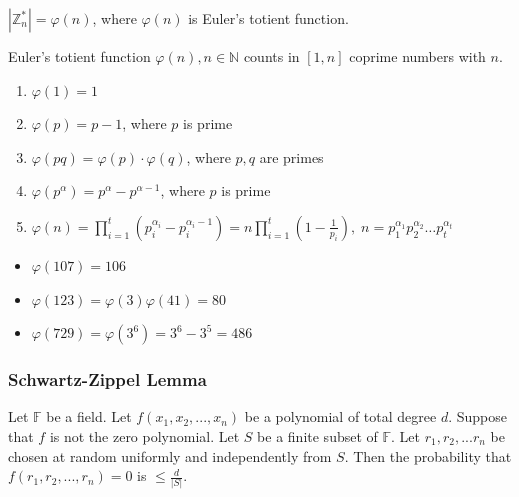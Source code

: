 \documentclass[../lecture-notes.tex]{subfiles}
\begin{document}
\begin{lemma}
    $|\mathbb{Z}_{n}^{*}| = \varphi(n)$, where $\varphi(n)$ is Euler's totient function.
\end{lemma}

\begin{definition}
    Euler's totient function $\varphi(n), n \in \mathbb{N}$ counts in $[1, n]$ coprime numbers with $n$. 
\end{definition}

\begin{lemma}
    \hfill
    \begin{enumerate}
        \item $\varphi(1) = 1$
        \item $\varphi(p) = p - 1$, where $p$ is prime
        \item $\varphi(pq) = \varphi(p) \cdot \varphi(q)$, where $p, q$ are primes
        \item $\varphi(p^{\alpha}) = p^{\alpha} - p^{\alpha - 1}$, where $p$ is prime
        \item $\varphi(n) = \prod_{i = 1}^{t} (p_{i}^{\alpha_i} - p_{i}^{\alpha_i - 1}) = n\prod_{i = 1}^{t} (1 - \frac{1}{p_i}), \; n = p_{1}^{\alpha_1}p_{2}^{\alpha_2} \dots p_{t}^{\alpha_t}$
    \end{enumerate}    
\end{lemma}

\begin{example}
    \hfill

    \begin{itemize}
        \item $\varphi(107) = 106$
        \item $\varphi(123) = \varphi(3)\varphi(41) = 80$
        \item $\varphi(729) = \varphi(3^6) = 3^6 - 3^5 = 486$
    \end{itemize}
\end{example}

\subsubsection{Schwartz-Zippel Lemma}

\begin{lemma}\label{lemma:sz}
Let $\mathbb{F}$ be a field. Let $f(x_1, x_2, ..., x_n)$ be a polynomial of total degree $d$. Suppose that $f$ is not the zero polynomial. Let $S$ be
a finite subset of $\mathbb{F}$. Let $r_1, r_2, ... r_n$ be chosen at random uniformly and independently from $S$. Then the probability that 
$f(r_1, r_2, ..., r_n) = 0$ is $\le \frac{d}{|S|}$.
\end{lemma}
\end{document}
